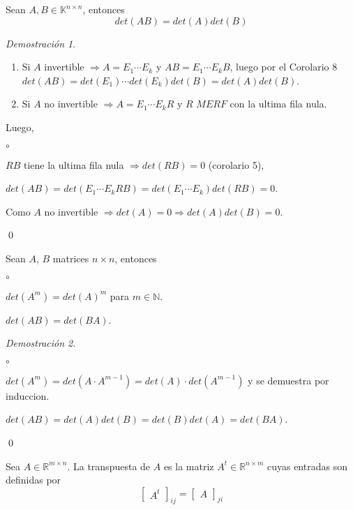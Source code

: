 \documentclass{article}
\theoremstyle{definition}
\theoremstyle{definition}
\theoremstyle{remark}
\newtheorem*{demo}{Demostración}
\begin{document}
\begin{teo}
  Sean $A,B \in \mathbb{K}^{n \times n}$, entonces \[
det(AB)=det(A)det(B)
  \]
\end{teo}
\begin{demo}\;\\
\begin{enumerate}[label=-]
\item Si $A$ invertible $\Rightarrow A=E_1 \cdots E_k$ y $AB=E_1 \cdots E_kB$, luego por el Corolario 8 $det(AB)=det(E_1) \cdots det(E_k) det(B) = det(A) det(B)$. 
\item Si $A$ no invertible $\Rightarrow A=E_1 \cdots E_k R$ y $R$ $MERF$ con la ultima fila nula. 
\end{enumerate}Luego,
\begin{list}{$\circ$}{}  
\item $RB$ tiene la ultima fila nula $\Rightarrow det(RB)=0$ (corolario 5), 
\item $det(AB)=det(E_1 \cdots E_k RB) = det(E_1 \cdots E_k)det(RB)=0$. 
\item Como $A$ no invertible $\Rightarrow det(A)=0 \Rightarrow det(A) det (B) = 0$.
\end{list}\qed
\end{demo}
\begin{corol}
Sean $A$, $B$ matrices $n \times n$, entonces \begin{list}{$\circ$}{}  
\item  $det(A^{m})=det(A)^{m}$ para $m \in \mathbb{N}$. 
\item $det(AB)=det(BA)$.
\end{list}
\end{corol}
\begin{demo}
  \;
\begin{list}{$\circ$}{}  
\item $det(A^m)=det(A \cdot A^{m -1 })=det(A) \cdot det(A^{m - 1})$ y se demuestra por induccion. 
\item $det(AB)=det(A)det(B)=det(B)det(A)=det(BA)$. 
\end{list}
\qed
\end{demo}
\begin{defi}
  Sea $A \in \mathbb{R}^{m \times n}$. La transpuesta de $A$ es la matriz $A^t \in \mathbb{R}^{n \times m}$ cuyas entradas son definidas por \[
\begin{bmatrix}A^{t}\end{bmatrix}_{ij}=\begin{bmatrix}A\end{bmatrix}_{ji}
  \]
\end{defi}
\end{document}
